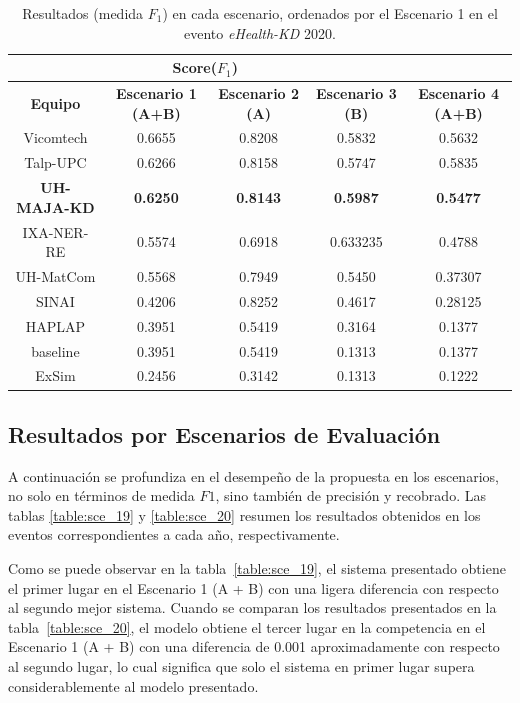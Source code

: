 \begin{table}[tb!]\centering
	\caption{Resultados (medida $F_1$) en cada escenario, ordenados por el Escenario 1 en el evento \textit{eHealth-KD} 2020. \label{table:results_19}}
	\begin{tabular}{|c|c|c|c|c|}
		\hline
		&  \multicolumn{2}{c|}{\textbf{Score($F_1$)}} \\
		\hline
		\textbf{Equipo} & \textbf{Escenario 1 (A+B)} & \textbf{Escenario 2 (A)} & \textbf{Escenario 3 (B)} &  \textbf{Escenario 4 (A+B)}\\
		\hline
		Vicomtech & 0.6655 & 0.8208 & 0.5832 & 0.5632 \\
		Talp-UPC & 0.6266 & 0.8158 & 0.5747 & 0.5835  \\
		\textbf{UH-MAJA-KD} & \textbf{0.6250} & \textbf{0.8143} & \textbf{0.5987} & \textbf{0.5477} \\
		IXA-NER-RE & 0.5574 & 0.6918 & 0.633235 & 0.4788 \\
		UH-MatCom &	0.5568 & 0.7949 & 0.5450 & 0.37307 \\
		SINAI &	0.4206 & 0.8252 & 0.4617 & 0.28125 \\
		HAPLAP & 0.3951 & 0.5419 & 0.3164 & 0.1377 \\
		baseline & 0.3951 & 0.5419 & 0.1313 & 0.1377 \\
		ExSim &	0.2456 & 0.3142 & 0.1313 & 0.1222 \\
		\hline
	\end{tabular}
\end{table}


\subsection{Resultados por Escenarios de Evaluación}

A continuación se profundiza en el desempeño de la propuesta en los escenarios, no solo en términos de medida $F1$, sino también de precisión y recobrado.
Las tablas \ref{table:sce_19} y \ref{table:sce_20} resumen los resultados obtenidos en los eventos correspondientes a cada año, respectivamente.

Como se puede observar en la tabla~\ref{table:sce_19}, el sistema presentado obtiene el primer lugar en el Escenario 1 (A + B) con una ligera diferencia con respecto al segundo mejor sistema. Cuando se comparan los resultados presentados en la tabla~\ref{table:sce_20}, el modelo obtiene el tercer lugar en la competencia en el Escenario 1 (A + B) con una diferencia de 0.001 aproximadamente con respecto al segundo lugar, lo cual significa que solo el sistema en primer lugar supera considerablemente al modelo presentado.

